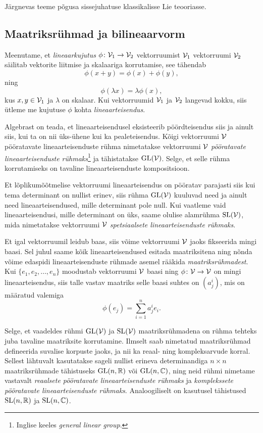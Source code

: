 Järgnevas teeme põgusa sissejuhatuse klassikalisse Lie teooriasse.

\subsection{Maatriksrühmad ja bilineaarvorm}\label{subsec:mat-ryhmad-ja-bilinvorm}

Meenutame, et \emph{lineaarkujutus}
$\phi \colon \mathcal{V}_1 \to \mathcal{V}_2$ vektorruumist $\mathcal{V}_1$ vektorruumi $\mathcal{V}_2$ säilitab
vektorite liitmise ja skalaariga korrutamise, see tähendab
\[ \phi(x + y) = \phi(x) + \phi(y), \]
ning
\[ \phi(\lambda x) = \lambda \phi(x), \]
kus $x, y \in \mathcal{V}_1$ ja $\lambda$ on skalaar. Kui vektorruumid $\mathcal{V}_1$ ja $\mathcal{V}_2$
langevad kokku, siis ütleme me kujutuse $\phi$ kohta \emph{lineaarteisendus}.

Algebrast on teada, et lineaarteisendusel eksisteerib pöördteisendus siis ja
ainult siis, kui ta on nii üks-ühene kui ka pealeteisendus. Kõigi vektorruumi $\mathcal{V}$
pööratavate lineaarteisenduste rühma nimetatakse vektorruumi $\mathcal{V}$
\emph{pööratavate lineaarteisenduste rühmaks}\footnote{Inglise keeles
\emph{general linear group}.} ja tähistatakse $\operatorname{GL}(\mathcal{V})$. Selge, et selle
rühma korrutamiseks on tavaline lineaarteisenduste kompositsioon.

Et lõplikumõõtmelise vektorruumi lineaarteisendus on pööratav parajasti siis
kui tema determinant on nullist erinev, siis rühma $\operatorname{GL}(\mathcal{V})$ kuuluvad
need ja ainult need lineaarteisendused, mille determinant pole null.
Kui vaatleme vaid lineaarteisendusi, mille determinant on üks, saame olulise
alamrühma $\operatorname{SL}(\mathcal{V})$, mida nimetatakse vektorruumi $\mathcal{V}$
\emph{spetsiaalsete lineaarteisenduste rühmaks}.

Et igal vektorruumil leidub baas, siis võime vektorruumi $\mathcal{V}$ jaoks
fikseerida mingi baasi. Sel juhul
saame kõik lineaarteisendused esitada maatriksitena ning nõnda võime
edaspidi lineaarteisenduste rühmade asemel rääkida \emph{maatriksrühmadest}.
Kui $\{e_1, e_2, \dots, e_n\}$ moodustab vektorruumi $\mathcal{V}$ baasi ning
$\phi \colon \mathcal{V} \to \mathcal{V}$ on mingi lineaarteisendus, siis talle vastav maatriks
selle baasi suhtes on $(a^i_j)$, mis on määratud valemiga
\[ \phi(e_j) = \sum_{i=1}^{n} a^i_j e_i. \]

Selge, et vaadeldes rühmi $\operatorname{GL}(\mathcal{V})$ ja $\operatorname{SL}(\mathcal{V})$ maatriksrühmadena
on rühma tehteks juba tavaline maatriksite korrutamine. Ilmselt saab
nimetatud maatriksrühmad defineerida suvalise korpuste jaoks, ja nii ka
reaal- ning kompleksarvude korral. Sellest lähtuvalt kasutatakse sageli
nullist erineva determinandiga $n \times n$ maatriksrühmade tähistuseks
$\operatorname{GL}(n, \mathbb{R})$ või $\operatorname{GL}(n, \mathbb{C})$, ning neid rühmi nimetame vastavalt
\emph{reaalsete pööratavate lineaarteisenduste rühmaks} ja \emph{komplekssete
pööratavate lineaarteisenduste rühmaks}. Analoogiliselt on kasutusel
tähistused $\operatorname{SL}(n, \mathbb{R})$ ja $\operatorname{SL}(n, \mathbb{C})$.

